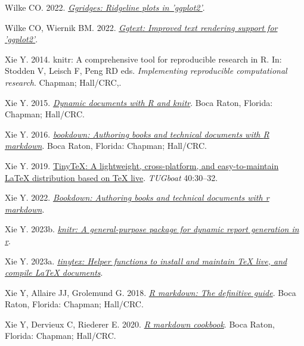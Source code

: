 \documentclass[10pt,a4paper]{article}
\newlength{\cslhangindent}
\newlength{\cslentryspacingunit} %
\newenvironment{CSLReferences}[2] %
 {%
  \setlength{\parindent}{0pt}
  \ifodd #1
  \let\oldpar\par
  \def\par{\hangindent=\cslhangindent\oldpar}
  \fi
  \setlength{\parskip}{#2\cslentryspacingunit}
 }%
 {}
\begin{document}
\begin{CSLReferences}{1}{0}
Wilke CO. 2022. \emph{\href{https://CRAN.R-project.org/package=ggridges}{Ggridges: Ridgeline plots in 'ggplot2'}}.

Wilke CO, Wiernik BM. 2022. \emph{\href{https://CRAN.R-project.org/package=ggtext}{Ggtext: Improved text rendering support for 'ggplot2'}}.

Xie Y. 2014. {knitr}: A comprehensive tool for reproducible research in {R}. In: Stodden V, Leisch F, Peng RD eds. \emph{Implementing reproducible computational research}. Chapman; Hall/CRC,.

Xie Y. 2015. \emph{\href{https://yihui.org/knitr/}{Dynamic documents with {R} and knitr}}. Boca Raton, Florida: Chapman; Hall/CRC.

Xie Y. 2016. \emph{\href{https://bookdown.org/yihui/bookdown}{{bookdown}: Authoring books and technical documents with {R} markdown}}. Boca Raton, Florida: Chapman; Hall/CRC.

Xie Y. 2019. \href{https://tug.org/TUGboat/Contents/contents40-1.html}{{TinyTeX}: A lightweight, cross-platform, and easy-to-maintain LaTeX distribution based on TeX live}. \emph{TUGboat} 40:30--32.

Xie Y. 2022. \emph{\href{https://CRAN.R-project.org/package=bookdown}{Bookdown: Authoring books and technical documents with r markdown}}.

Xie Y. 2023b. \emph{\href{https://yihui.org/knitr/}{{knitr}: A general-purpose package for dynamic report generation in r}}.

Xie Y. 2023a. \emph{\href{https://github.com/rstudio/tinytex}{{tinytex}: Helper functions to install and maintain TeX live, and compile LaTeX documents}}.

Xie Y, Allaire JJ, Grolemund G. 2018. \emph{\href{https://bookdown.org/yihui/rmarkdown}{R markdown: The definitive guide}}. Boca Raton, Florida: Chapman; Hall/CRC.

Xie Y, Dervieux C, Riederer E. 2020. \emph{\href{https://bookdown.org/yihui/rmarkdown-cookbook}{R markdown cookbook}}. Boca Raton, Florida: Chapman; Hall/CRC.

\end{CSLReferences}
\end{document}
